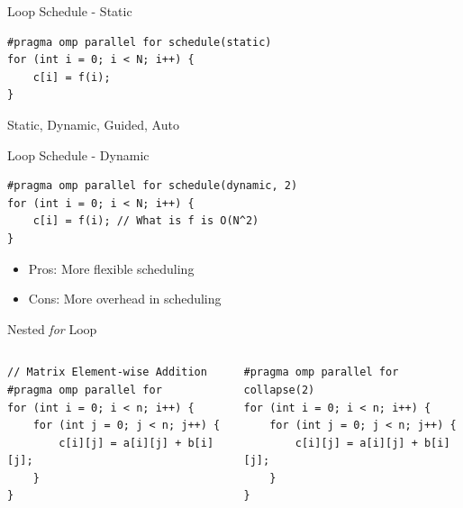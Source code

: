 \begin{frame}[fragile]{Loop Schedule - Static}

  \begin{verbatim}
#pragma omp parallel for schedule(static)
for (int i = 0; i < N; i++) {
    c[i] = f(i);
}
\end{verbatim}

  Static, Dynamic, Guided, Auto
\end{frame}

\begin{frame}[fragile]{Loop Schedule - Dynamic}

  \begin{verbatim}
#pragma omp parallel for schedule(dynamic, 2)
for (int i = 0; i < N; i++) {
    c[i] = f(i); // What is f is O(N^2)
}
\end{verbatim}

  \begin{itemize}
    \item[\emoji{thumbs-up}] Pros: More flexible scheduling
    \item[\emoji{thumbs-down}] Cons: More overhead in scheduling
  \end{itemize}

\end{frame}

\begin{frame}[fragile]{Nested \textit{for} Loop}
  \begin{columns}[T] %
    \begin{column}{0.5\textwidth}
      \vspace{-10pt} %
      \begin{verbatim}
// Matrix Element-wise Addition
#pragma omp parallel for
for (int i = 0; i < n; i++) {
    for (int j = 0; j < n; j++) {
        c[i][j] = a[i][j] + b[i][j];
    }
}
      \end{verbatim}
    \end{column}

    \begin{column}{0.5\textwidth}
      \vspace{-10pt} %
      \begin{verbatim}
#pragma omp parallel for collapse(2)
for (int i = 0; i < n; i++) {
    for (int j = 0; j < n; j++) {
        c[i][j] = a[i][j] + b[i][j];
    }
}
      \end{verbatim}
    \end{column}
  \end{columns}
\end{frame}
